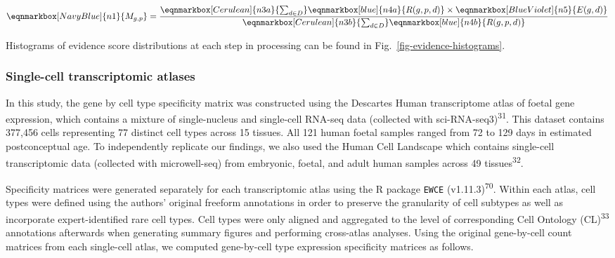 \documentclass[
sn-nature
]{sn-jnl}
\begin{document}
\begin{equation*}
  \eqnmarkbox[NavyBlue]{n1}{M_{g,p}}
  =
  \frac{
    \eqnmarkbox[Cerulean]{n3a}{\sum_{d \in D}}
    \eqnmarkbox[blue]{n4a}{R(g,p,d)} 
    \times 
    \eqnmarkbox[BlueViolet]{n5}{E(g,d)}  
  }{
    \eqnmarkbox[Cerulean]{n3b}{\sum_{d \in D}}
    \eqnmarkbox[blue]{n4b}{R(g,p,d)}
  }
\end{equation*}

\hfill\break

Histograms of evidence score distributions at each step in processing
can be found in Fig.~\ref{fig-evidence-histograms}.

\subsubsection{Single-cell transcriptomic
atlases}\label{single-cell-transcriptomic-atlases}

In this study, the gene by cell type specificity matrix was constructed
using the Descartes Human transcriptome atlas of foetal gene expression,
which contains a mixture of single-nucleus and single-cell RNA-seq data
(collected with sci-RNA-seq3)\textsuperscript{31}. This dataset contains
377,456 cells representing 77 distinct cell types across 15 tissues. All
121 human foetal samples ranged from 72 to 129 days in estimated
postconceptual age. To independently replicate our findings, we also
used the Human Cell Landscape which contains single-cell transcriptomic
data (collected with microwell-seq) from embryonic, foetal, and adult
human samples across 49 tissues\textsuperscript{32}.

Specificity matrices were generated separately for each transcriptomic
atlas using the R package \texttt{EWCE} (v1.11.3)\textsuperscript{70}.
Within each atlas, cell types were defined using the authors' original
freeform annotations in order to preserve the granularity of cell
subtypes as well as incorporate expert-identified rare cell types. Cell
types were only aligned and aggregated to the level of corresponding
Cell Ontology (CL)\textsuperscript{33} annotations afterwards when
generating summary figures and performing cross-atlas analyses. Using
the original gene-by-cell count matrices from each single-cell atlas, we
computed gene-by-cell type expression specificity matrices as follows.
\end{document}
